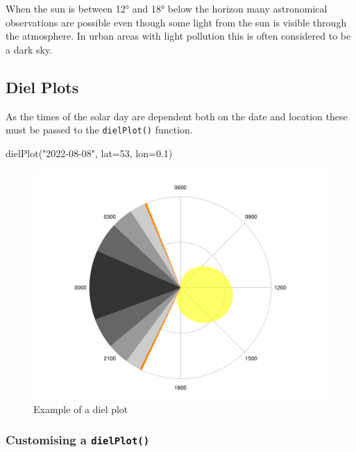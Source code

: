 \documentclass[
]{book}
\newenvironment{Shaded}{\begin{snugshade}}{\end{snugshade}}
\newcommand{\AttributeTok}[1]{\textcolor[rgb]{0.77,0.63,0.00}{#1}}
\newcommand{\DecValTok}[1]{\textcolor[rgb]{0.00,0.00,0.81}{#1}}
\newcommand{\FloatTok}[1]{\textcolor[rgb]{0.00,0.00,0.81}{#1}}
\newcommand{\FunctionTok}[1]{\textcolor[rgb]{0.00,0.00,0.00}{#1}}
\newcommand{\NormalTok}[1]{#1}
\newcommand{\StringTok}[1]{\textcolor[rgb]{0.31,0.60,0.02}{#1}}
\begin{document}
When the sun is between 12° and 18° below the horizon many astronomical observations are possible even though some light from the sun is visible through the atmosphere. In urban areas with light pollution this is often considered to be a dark sky.

\hypertarget{diel-plots}{%
\subsection{Diel Plots}\label{diel-plots}}

As the times of the solar day are dependent both on the date and location these must be passed to the \texttt{dielPlot()} function.

\begin{Shaded}
\begin{Highlighting}[]
\FunctionTok{dielPlot}\NormalTok{(}\StringTok{"2022{-}08{-}08"}\NormalTok{, }\AttributeTok{lat=}\DecValTok{53}\NormalTok{, }\AttributeTok{lon=}\FloatTok{0.1}\NormalTok{)}
\end{Highlighting}
\end{Shaded}

\begin{figure}

{\centering \includegraphics[width=0.9\linewidth]{_main_files/figure-latex/diel-plot-1-1} 

}

\caption{Example of a diel plot}\label{fig:diel-plot-1}
\end{figure}

\hypertarget{customising-a-dielplot}{%
\subsubsection{\texorpdfstring{Customising a \texttt{dielPlot()}}{Customising a dielPlot()}}\label{customising-a-dielplot}}
\end{document}
